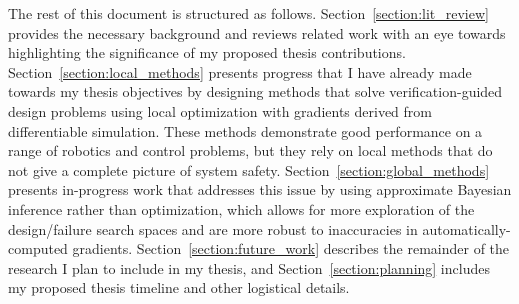 The rest of this document is structured as follows. Section~\ref{section:lit_review} provides the necessary background and reviews related work with an eye towards highlighting the significance of my proposed thesis contributions. Section~\ref{section:local_methods} presents progress that I have already made towards my thesis objectives by designing methods that solve verification-guided design problems using local optimization with gradients derived from differentiable simulation. These methods demonstrate good performance on a range of robotics and control problems, but they rely on local methods that do not give a complete picture of system safety. Section~\ref{section:global_methods} presents in-progress work that addresses this issue by using approximate Bayesian inference rather than optimization, which allows for more exploration of the design/failure search spaces and are more robust to inaccuracies in automatically-computed gradients. Section~\ref{section:future_work} describes the remainder of the research I plan to include in my thesis, and Section~\ref{section:planning} includes my proposed thesis timeline and other logistical details.




